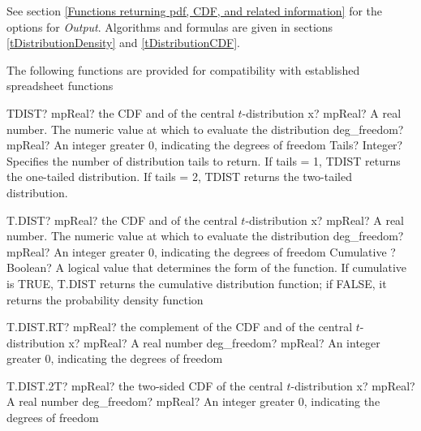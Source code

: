 \vspace{0.3cm}
See section \ref{Functions returning pdf, CDF, and related information} for the options for {\itshape\sffamily Output}. Algorithms and formulas are given in sections \ref{tDistributionDensity} and \ref{tDistributionCDF}.


\vspace{0.3cm}
The following functions are provided for compatibility with established spreadsheet functions

\vspace{0.3cm}
\begin{mpFunctionsExtract}
	\mpWorksheetFunctionThreeNotImplemented
	{TDIST? mpReal? the CDF and of the central $t$-distribution}
	{x? mpReal? A real number. The numeric value at which to evaluate the distribution}
	{deg\_freedom? mpReal? An integer  greater 0, indicating the degrees of freedom}
	{Tails? Integer? Specifies the number of distribution tails to return. If tails = 1, TDIST returns the one-tailed distribution. If tails = 2, TDIST returns the two-tailed distribution.}
\end{mpFunctionsExtract}

\vspace{0.6cm}
\begin{mpFunctionsExtract}
	\mpWorksheetFunctionThreeNotImplemented
	{T.DIST? mpReal? the CDF and of the central $t$-distribution}
	{x? mpReal? A real number. The numeric value at which to evaluate the distribution}
	{deg\_freedom? mpReal? An integer  greater 0, indicating the degrees of freedom}
	{Cumulative ? Boolean? A logical value that determines the form of the function. If cumulative is TRUE, T.DIST returns the cumulative distribution function; if FALSE, it returns the probability density function}
\end{mpFunctionsExtract}

\vspace{0.6cm}
\begin{mpFunctionsExtract}
	\mpWorksheetFunctionTwoNotImplemented
	{T.DIST.RT? mpReal? the complement of the CDF and of the central $t$-distribution}
	{x? mpReal? A real number}
	{deg\_freedom? mpReal? An integer  greater 0, indicating the degrees of freedom}
\end{mpFunctionsExtract}

\vspace{0.6cm}
\begin{mpFunctionsExtract}
	\mpWorksheetFunctionTwoNotImplemented
	{T.DIST.2T? mpReal? the two-sided CDF of the central $t$-distribution}
	{x? mpReal? A real number}
	{deg\_freedom? mpReal? An integer  greater 0, indicating the degrees of freedom}
\end{mpFunctionsExtract}



